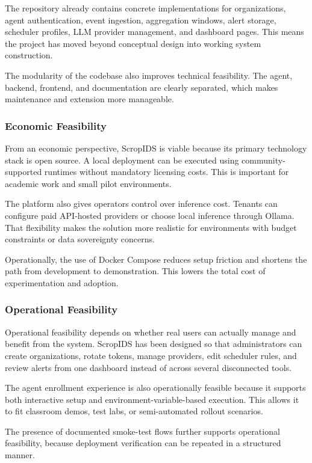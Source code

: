 \documentclass[12pt,a4paper]{article}
\begin{document}
The repository already contains concrete implementations for organizations, agent authentication, event ingestion, aggregation windows, alert storage, scheduler profiles, LLM provider management, and dashboard pages. This means the project has moved beyond conceptual design into working system construction.

The modularity of the codebase also improves technical feasibility. The agent, backend, frontend, and documentation are clearly separated, which makes maintenance and extension more manageable.

\subsubsection{Economic Feasibility}
From an economic perspective, ScropIDS is viable because its primary technology stack is open source. A local deployment can be executed using community-supported runtimes without mandatory licensing costs. This is important for academic work and small pilot environments.

The platform also gives operators control over inference cost. Tenants can configure paid API-hosted providers or choose local inference through Ollama. That flexibility makes the solution more realistic for environments with budget constraints or data sovereignty concerns.

Operationally, the use of Docker Compose reduces setup friction and shortens the path from development to demonstration. This lowers the total cost of experimentation and adoption.

\subsubsection{Operational Feasibility}
Operational feasibility depends on whether real users can actually manage and benefit from the system. ScropIDS has been designed so that administrators can create organizations, rotate tokens, manage providers, edit scheduler rules, and review alerts from one dashboard instead of across several disconnected tools.

The agent enrollment experience is also operationally feasible because it supports both interactive setup and environment-variable-based execution. This allows it to fit classroom demos, test labs, or semi-automated rollout scenarios.

The presence of documented smoke-test flows further supports operational feasibility, because deployment verification can be repeated in a structured manner.
\end{document}
